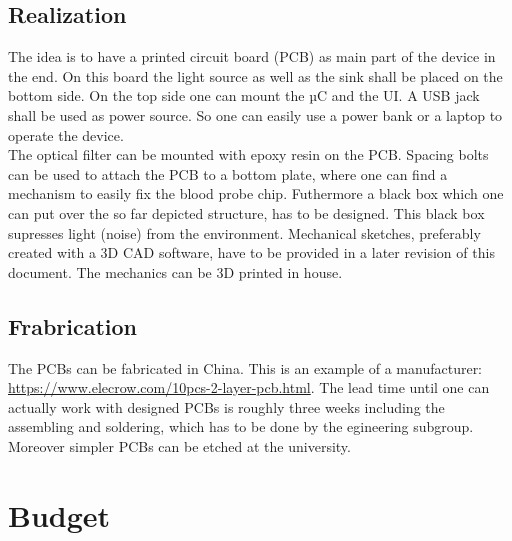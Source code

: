 \documentclass{report}
\newcommand{\newpar}{\vspace{1em}\\}
\begin{document}
\section{Realization}
The idea is to have a printed circuit board (PCB) as main part of the device in the end. On this board the light source as well as the sink shall be placed on the bottom side. On the top side one can mount the µC and the UI. A USB jack shall be used as power source. So one can easily use a power bank or a laptop to operate the device.  
\newpar
The optical filter can be mounted with epoxy resin on the PCB. Spacing bolts can be used to attach the PCB to a bottom plate, where one can find a mechanism to easily fix the blood probe chip. Futhermore a black box which one can put over the so far depicted structure, has to be designed. This black box supresses light (noise) from the environment. Mechanical sketches, preferably created with a 3D CAD software, have to be provided in a later revision of this document. The mechanics can be 3D printed in house.     

\section{Frabrication}
The PCBs can be fabricated in China. This is an example of a manufacturer: \url{https://www.elecrow.com/10pcs-2-layer-pcb.html}. The lead time until one can actually work with designed PCBs is roughly three weeks including the assembling and soldering, which has to be done by the egineering subgroup. Moreover simpler PCBs can be etched at the university.    

\chapter{Budget}
\end{document}
